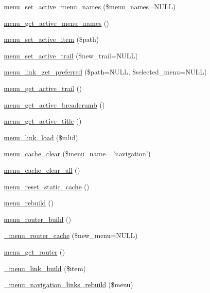 \begin{DoxyCompactItemize}
\item 
\hyperlink{group__menu_gadf802fedf19e7b29e3970e936bae9bc0}{menu\_\-set\_\-active\_\-menu\_\-names} (\$menu\_\-names=NULL)
\item 
\hyperlink{group__menu_ga421798c040a98ec1b5d583e7a7a5e65b}{menu\_\-get\_\-active\_\-menu\_\-names} ()
\item 
\hyperlink{group__menu_gacdd22102c2ba6545645ae34be563d1d4}{menu\_\-set\_\-active\_\-item} (\$path)
\item 
\hyperlink{group__menu_ga9328a9a4f297d8bb095d924e75a8abd7}{menu\_\-set\_\-active\_\-trail} (\$new\_\-trail=NULL)
\item 
\hyperlink{group__menu_gad5fbd7dfd77f1496d636d130a3ff591d}{menu\_\-link\_\-get\_\-preferred} (\$path=NULL, \$selected\_\-menu=NULL)
\item 
\hyperlink{group__menu_ga55105d602c5c5ea5b39aae25aa47f8c5}{menu\_\-get\_\-active\_\-trail} ()
\item 
\hyperlink{group__menu_ga009731c4b3e736ebb620ba90e7f04207}{menu\_\-get\_\-active\_\-breadcrumb} ()
\item 
\hyperlink{group__menu_gaf0a358447097959e53ad1a20b8d811ed}{menu\_\-get\_\-active\_\-title} ()
\item 
\hyperlink{group__menu_gac2b338fa3a449c826661aade7a7d486e}{menu\_\-link\_\-load} (\$mlid)
\item 
\hyperlink{group__menu_ga032d6b78c7deab10685ebfa6f32ad7eb}{menu\_\-cache\_\-clear} (\$menu\_\-name= 'navigation')
\item 
\hyperlink{group__menu_ga0a10fa44ca152a12091747e515b6a655}{menu\_\-cache\_\-clear\_\-all} ()
\item 
\hyperlink{group__menu_ga1475a636851e8c953db72e5b1ab2c0f0}{menu\_\-reset\_\-static\_\-cache} ()
\item 
\hyperlink{group__menu_gaf36dcb9d5491ef5e7d2cf22c1f5c69f4}{menu\_\-rebuild} ()
\item 
\hyperlink{group__menu_ga1f6713b93173302fb29d7bc9578b7530}{menu\_\-router\_\-build} ()
\item 
\hyperlink{group__menu_ga02af3d3800722e9ff5be36485b655905}{\_\-menu\_\-router\_\-cache} (\$new\_\-menu=NULL)
\item 
\hyperlink{group__menu_ga7140ecddb2c59ae8acc74968eb339e67}{menu\_\-get\_\-router} ()
\item 
\hyperlink{group__menu_gadf1f694a2079dcdd6526150eb195915b}{\_\-menu\_\-link\_\-build} (\$item)
\item 
\hyperlink{group__menu_ga69fdf86c20d033bc7ba46a14937e20ea}{\_\-menu\_\-navigation\_\-links\_\-rebuild} (\$menu)

\end{DoxyCompactItemize}
